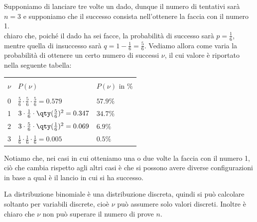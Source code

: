 \begin{esempio}
   Supponiamo di lanciare tre volte un dado, dunque il numero di tentativi sarà $n=3$ e supponiamo che il successo consista nell'ottenere la faccia con il numero 1.\\
   \E chiaro che, poiché il dado ha sei facce, la probabilità di successo sarà $p=\frac{1}{6}$, mentre quella di insuccesso sarà $q=1-\frac{1}{6}=\frac{5}{6}$. Vediamo allora come varia la probabilità di ottenere un certo numero di successi $\nu$, il cui valore è riportato nella seguente tabella:
   \begin{center}
      \begin{tabular}{|l|l|l|}
         \hline
         &&\\[-0.4cm]
         $\nu$ & $P(\nu)$ & $P(\nu)$ in \%\\[0.1cm]
         \hline
         &&\\[-0.4cm]
         0 & $\frac{5}{6} \cdot \frac{5}{6} \cdot \frac{5}{6}=0.579$ & $57.9\%$\\[0.2cm]
         1 & $3 \cdot \frac{1}{6} \cdot \qty(\frac{5}{6})^2=0.347$ & $34.7\%$\\[0.2cm]
         2 & $3 \cdot \frac{5}{6} \cdot \qty(\frac{1}{6})^2=0.069$ & $6.9\%$\\[0.2cm]
         3 & $\frac{1}{6} \cdot \frac{1}{6} \cdot \frac{1}{6}=0.005$ & $0.5\%$\\[0.2cm]
         \hline
      \end{tabular}
   \end{center}
   Notiamo che, nei casi in cui otteniamo una o due volte la faccia con il numero 1, ciò che cambia rispetto agli altri casi è che si possono avere diverse configurazioni in base a qual è il lancio in cui si ha successo.
\end{esempio}

La distribuzione binomiale è una distribuzione discreta, quindi si può calcolare soltanto per variabili discrete, cioè $\nu$ può assumere solo valori discreti. Inoltre è chiaro che $\nu$ non può superare il numero di prove $n$. 

